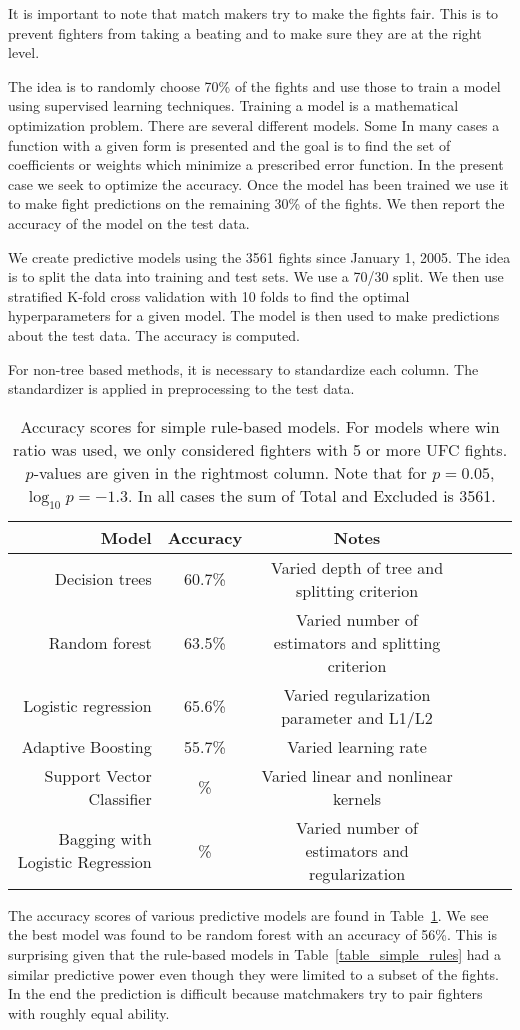 It is important to note that match makers try to make
the fights fair. This is to prevent fighters from taking
a beating and to make sure they are at the right level.

The idea is to randomly choose 70\% of the fights and
use those to train a model using supervised
learning techniques.
Training a model is a mathematical optimization problem.
There are several different models. Some 
In many cases a function with a given form is presented
and the goal is to find the set of coefficients or weights
which minimize a prescribed error function. In the present
case we seek to optimize the accuracy.
Once the model has been
trained we use it to make fight predictions on
the remaining 30\% of the fights. We then report the
accuracy of the model on the test data.


We create predictive models using the 3561 fights since
January 1, 2005. The idea is to split the data into
training and test sets. We use a 70/30 split. We then
use stratified K-fold cross validation with 10 folds
to find the optimal
hyperparameters for a given model. The model is then
used to make predictions about the test data. The accuracy
is computed.

For non-tree based methods, it is necessary to standardize
each column. The standardizer is applied in preprocessing to
the test data.

\begin{center}
\begin{table}[h]
\begin{tabular}{r|ccccc}
  \toprule
  Model & Accuracy & Notes\\
  \hline
  Decision trees & 60.7\% & Varied depth of tree and splitting criterion\\
  Random forest & 63.5\% & Varied number of estimators and splitting criterion\\
  Logistic regression & 65.6\% & Varied regularization parameter and L1/L2\\
  Adaptive Boosting & 55.7\% & Varied learning rate\\
  Support Vector Classifier & \% & Varied linear and nonlinear kernels\\
  Bagging with Logistic Regression & \% & Varied number of estimators and regularization\\
  \bottomrule
\end{tabular}
\caption{Accuracy scores for simple rule-based models. For models where win ratio was used, we only considered
fighters with 5 or more UFC fights. $p$-values are given in the rightmost column. Note that for $p=0.05$, $\log_{10}p = -1.3$. In all
cases the sum of
Total and Excluded is 3561.}
\label{table_ML_models}
\end{table}
\end{center}

The accuracy scores of various predictive models are found in Table~\ref{table_ML_models}.
We see the best model was found to be random forest with an accuracy of 56\%. This is
surprising given that the rule-based models in Table~\ref{table_simple_rules} had a
similar predictive power even though they were limited to a subset of the fights.
In the end the prediction is difficult because matchmakers try to pair fighters with
roughly equal ability.
